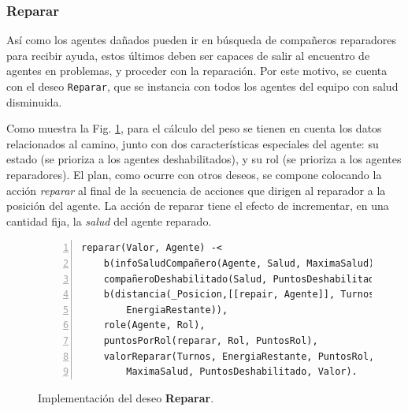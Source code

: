 \documentclass[oneside]{book}
\theoremstyle{definition}
\begin{document}
\subsubsection{Reparar}

Así como los agentes dañados pueden ir en búsqueda de compañeros reparadores para recibir ayuda,
estos últimos deben ser capaces de salir al encuentro de agentes en problemas, y proceder con la 
reparación. Por este motivo, se cuenta con el deseo \texttt{Reparar}, que se instancia con todos 
los agentes del equipo con salud disminuida.

Como muestra la Fig. \ref{fig:deseoReparar}, para el cálculo del peso se tienen en cuenta los datos
relacionados al camino, junto con dos características especiales del agente: su estado (se prioriza 
a los agentes deshabilitados), y su rol (se prioriza a los agentes reparadores). El plan, como 
ocurre con otros deseos, se compone colocando la acción \textit{reparar} al final de la secuencia 
de acciones que dirigen al reparador a la posición del agente. La acción de reparar tiene el efecto 
de incrementar, en una cantidad fija, la \textit{salud} del agente reparado. 

\begin{figure}[h]
\begin{Verbatim}[numbers=left]
reparar(Valor, Agente) -<
	b(infoSaludCompañero(Agente, Salud, MaximaSalud)),
	compañeroDeshabilitado(Salud, PuntosDeshabilitado),
    b(distancia(_Posicion,[[repair, Agente]], Turnos, 
    	EnergiaRestante)),
    role(Agente, Rol),
	puntosPorRol(reparar, Rol, PuntosRol),
    valorReparar(Turnos, EnergiaRestante, PuntosRol, Salud, 
	    MaximaSalud, PuntosDeshabilitado, Valor).
\end{Verbatim}
\caption{Implementación del deseo \textbf{Reparar}.}
\label{fig:deseoReparar}
\end{figure}


    
 
 


%
%


\end{document}
